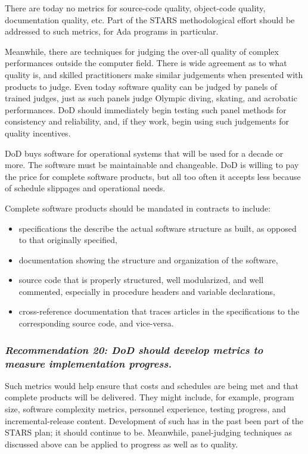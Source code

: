 \documentclass[12pt,final]{article}
\begin{document}
There are today no metrics for source-code quality, object-code quality,
documentation quality, etc. Part of the STARS methodological effort should be
addressed to such metrics, for Ada programs in particular.

Meanwhile, there are techniques for judging the over-all quality of complex
performances outside the computer field. There is wide agreement as to what
quality is, and skilled practitioners make similar judgements when presented
with products to judge. Even today software quality can be judged by panels of
trained judges, just as such panels judge Olympic diving, skating, and
acrobatic performances. DoD should immediately begin testing such panel methods
for consistency and reliability, and, if they work, begin using such judgements
for quality incentives.

DoD buys software for operational systems that will be used for a decade or
more. The software must be maintainable and changeable. DoD is willing to pay
the price for complete software products, but all too often it accepts less
because of schedule slippages and operational needs.

Complete software products should be mandated in contracts to include:

\begin{itemize}
    \item specifications the describe the actual software structure as built,
        as opposed to that originally specified,
    \item documentation showing the structure and organization of the software,
    \item source code that is properly structured, well modularized, and well
        commented, especially in procedure headers and variable declarations,
    \item cross-reference documentation that traces articles in the
        specifications to the corresponding source code, and vice-versa.
\end{itemize}

\label{rec:20}
\subsubsection*{\textit{Recommendation 20: DoD should develop metrics to
measure implementation progress.}}

Such metrics would help ensure that costs and schedules are being met and that
complete products will be delivered. They might include, for example, program
size, software complexity metrics, personnel experience, testing progress, and
incremental-release content. Development of such has in the past been part of
the STARS plan; it should continue to be. Meanwhile, panel-judging techniques
as discussed above can be applied to progress as well as to quality.
\end{document}
